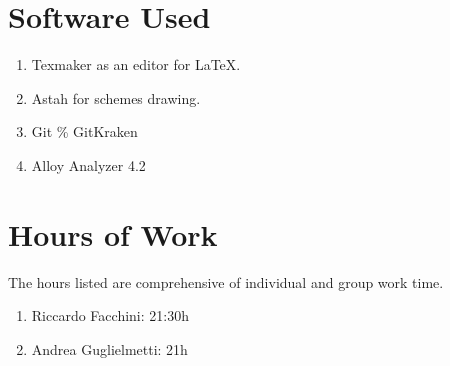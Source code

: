 \section{Software Used}
\begin{enumerate}
\item Texmaker as an editor for \LaTeX.
\item Astah for schemes drawing.
\item Git \% GitKraken
\item Alloy Analyzer 4.2
\end{enumerate}
\section{Hours of Work}
The hours listed are comprehensive of individual and group work time.
\begin{enumerate}
\item Riccardo Facchini: 21:30h
\item Andrea Guglielmetti: 21h
\end{enumerate}